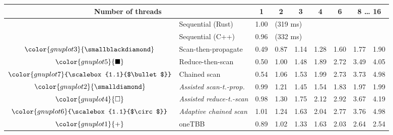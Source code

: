 \begin{tabular}{clrrrrrrr}
\toprule
\multicolumn{2}{c}{\textbf{Number of threads}} & \multicolumn{1}{c}{\textbf{ 1 }} & \multicolumn{1}{c}{\textbf{ 2 }} & \multicolumn{1}{c}{\textbf{ 3 }} & \multicolumn{1}{c}{\textbf{ 4 }} & \multicolumn{1}{c}{\textbf{ 6 }} & \multicolumn{2}{c}{\textbf{ 8 } \dots \textbf{ 16 }} \\
\midrule
& Sequential (Rust) & \multicolumn{1}{r}{ 1.00 } & \multicolumn{ 6 }{l}{(319 ms)} \\
& Sequential (C++) & \multicolumn{1}{r}{ 0.96 } & \multicolumn{ 6 }{l}{(332 ms)} \\
\rowcolor{gnuplot3!10}$\color{gnuplot3}{\smallblackdiamond}$ & Scan-then-propagate & \cellcolor{gnuplot3!10} 0.49 & \cellcolor{gnuplot3!10} 0.87 & \cellcolor{gnuplot3!10} 1.14 & \cellcolor{gnuplot3!10} 1.28 & \cellcolor{gnuplot3!10} 1.60 & \cellcolor{gnuplot3!10} 1.77 & \cellcolor{gnuplot3!10} 1.90 \\
\rowcolor{gnuplot5!10}$\color{gnuplot5}{\blacksquare}$ & Reduce-then-scan & \cellcolor{gnuplot5!10} 0.50 & \cellcolor{gnuplot5!10} 1.00 & \cellcolor{gnuplot5!10} 1.48 & \cellcolor{gnuplot5!10} 1.89 & \cellcolor{gnuplot5!10} 2.72 & \cellcolor{gnuplot5!10} 3.49 & \cellcolor{gnuplot5!10} 4.05 \\
\rowcolor{gnuplot7!10}$\color{gnuplot7}{\scalebox{1.1}{$\bullet$}}$ & Chained scan & \cellcolor{gnuplot7!10} 0.54 & \cellcolor{gnuplot7!10} 1.06 & \cellcolor{gnuplot7!10} 1.53 & \cellcolor{gnuplot7!10} 1.99 & \cellcolor{gnuplot7!10} 2.73 & \cellcolor{gnuplot7!10} 3.73 & \cellcolor{gnuplot7!10} 4.98 \\
\rowcolor{gnuplot2!30}$\color{gnuplot2}{\smalldiamond}$ & \textit{Assisted scan-t.-prop.} & \cellcolor{gnuplot2!30} 0.99 & \cellcolor{gnuplot2!30} 1.21 & \cellcolor{gnuplot2!30} 1.45 & \cellcolor{gnuplot2!30} 1.54 & \cellcolor{gnuplot2!30} 1.83 & \cellcolor{gnuplot2!30} 1.97 & \cellcolor{gnuplot2!30} 1.99 \\
\rowcolor{gnuplot4!30}$\color{gnuplot4}{\square}$ & \textit{Assisted reduce-t.-scan} & \cellcolor{gnuplot4!30} 0.98 & \cellcolor{gnuplot4!30} 1.30 & \cellcolor{gnuplot4!30} 1.75 & \cellcolor{gnuplot4!30} 2.12 & \cellcolor{gnuplot4!30} 2.92 & \cellcolor{gnuplot4!30} 3.67 & \cellcolor{gnuplot4!30} 4.19 \\
\rowcolor{gnuplot6!30}$\color{gnuplot6}{\scalebox{1.1}{$\circ$}}$ & \textit{Adaptive chained scan} & \cellcolor{gnuplot6!30} 1.01 & \cellcolor{gnuplot6!30} 1.24 & \cellcolor{gnuplot6!30} 1.63 & \cellcolor{gnuplot6!30} 2.04 & \cellcolor{gnuplot6!30} 2.77 & \cellcolor{gnuplot6!30} 3.76 & \cellcolor{gnuplot6!30} 4.98 \\
\rowcolor{gnuplot1!10}$\color{gnuplot1}{+}$ & oneTBB & \cellcolor{gnuplot1!10} 0.89 & \cellcolor{gnuplot1!10} 1.02 & \cellcolor{gnuplot1!10} 1.33 & \cellcolor{gnuplot1!10} 1.63 & \cellcolor{gnuplot1!10} 2.03 & \cellcolor{gnuplot1!10} 2.64 & \cellcolor{gnuplot1!10} 2.54 \\
\bottomrule
\end{tabular}
